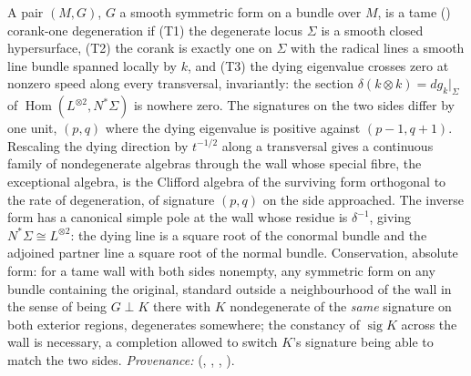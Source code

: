 A pair $(M,G)$, $G$ a smooth symmetric form on a bundle over $M$, is a tame () corank-one degeneration if (T1) the degenerate locus $\Sigma$ is a smooth closed hypersurface, (T2) the corank is exactly one on $\Sigma$ with the radical lines a smooth line bundle spanned locally by $k$, and (T3) the dying eigenvalue crosses zero at nonzero speed along every transversal, invariantly: the section $\delta(k \otimes k) = dg_{k}|_{\Sigma}$ of $\operatorname{Hom}(L^{\otimes 2}, N^{*}\Sigma)$ is nowhere zero. The signatures on the two sides differ by one unit, $(p,q)$ where the dying eigenvalue is positive against $(p-1, q+1)$. Rescaling the dying direction by $t^{-1/2}$ along a transversal gives a continuous family of nondegenerate algebras through the wall whose special fibre, the exceptional algebra, is the Clifford algebra of the surviving form orthogonal to the rate of degeneration, of signature $(p,q)$ on the side approached. The inverse form has a canonical simple pole at the wall whose residue is $\delta^{-1}$, giving $N^{*}\Sigma \cong L^{\otimes 2}$: the dying line is a square root of the conormal bundle and the adjoined partner line a square root of the normal bundle. Conservation, absolute form: for a tame wall with both sides nonempty, any symmetric form on any bundle containing the original, standard outside a neighbourhood of the wall in the sense of being $G \perp K$ there with $K$ nondegenerate of the \emph{same} signature on both exterior regions, degenerates somewhere; the constancy of $\operatorname{sig} K$ across the wall is necessary, a completion allowed to switch $K$'s signature being able to match the two sides. \emph{Provenance:} \cite[Hyp.~2.1, Lem.~2.2, Rem.~2.3, Prop.~6.1, Thm.~6.2, Thm.~5.1]{ButlerT4} (, , , ).
